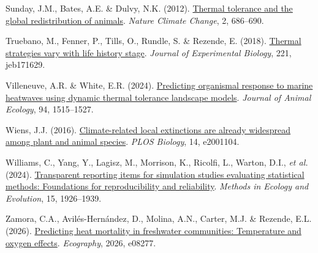\documentclass[
  11pt,
]{article}
\newlength{\cslhangindent}
\newenvironment{CSLReferences}[2] %
 {\begin{list}{}{%
  \setlength{\itemindent}{0pt}
  \setlength{\leftmargin}{0pt}
  \setlength{\parsep}{0pt}
  \ifodd #1
   \setlength{\leftmargin}{\cslhangindent}
   \setlength{\itemindent}{-1\cslhangindent}
  \fi
  \setlength{\itemsep}{#2\baselineskip}}}
 {\end{list}}
\begin{document}
\begin{CSLReferences}{1}{0}
Sunday, J.M., Bates, A.E. \& Dulvy, N.K. (2012).
\href{https://doi.org/10.1038/nclimate1539}{Thermal tolerance and the
global redistribution of animals}. \emph{Nature Climate Change}, 2,
686--690.

Truebano, M., Fenner, P., Tills, O., Rundle, S. \& Rezende, E. (2018).
\href{https://doi.org/10.1242/jeb.171629}{Thermal strategies vary with
life history stage}. \emph{Journal of Experimental Biology}, 221,
jeb171629.

Villeneuve, A.R. \& White, E.R. (2024).
\href{https://doi.org/10.1111/1365-2656.14120}{Predicting organismal
response to marine heatwaves using dynamic thermal tolerance landscape
models}. \emph{Journal of Animal Ecology}, 94, 1515--1527.

Wiens, J.J. (2016).
\href{https://doi.org/10.1371/journal.pbio.2001104}{Climate-related
local extinctions are already widespread among plant and animal
species}. \emph{PLOS Biology}, 14, e2001104.

Williams, C., Yang, Y., Lagisz, M., Morrison, K., Ricolfi, L., Warton,
D.I., \emph{et al.} (2024).
\href{https://doi.org/10.1111/2041-210x.14415}{Transparent reporting
items for simulation studies evaluating statistical methods: Foundations
for reproducibility and reliability}. \emph{Methods in Ecology and
Evolution}, 15, 1926--1939.

Zamora, C.A., Avilés-Hernández, D., Molina, A.N., Carter, M.J. \&
Rezende, E.L. (2026).
\href{https://doi.org/10.1002/ecog.08277}{Predicting heat mortality in
freshwater communities: Temperature and oxygen effects}.
\emph{Ecography}, 2026, e08277.

\end{CSLReferences}
\end{document}
